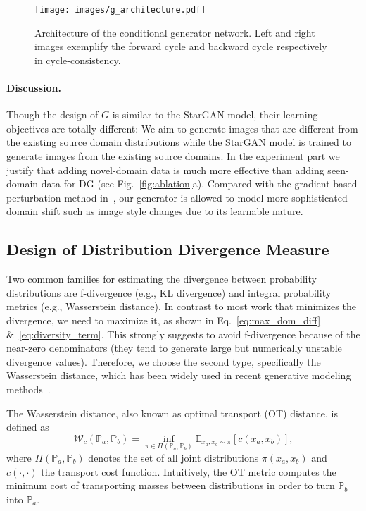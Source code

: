 \documentclass[runningheads]{llncs}
\begin{document}
\begin{figure}[t]
    \centering
    \texttt{[image: images/g\_architecture.pdf]}
    \caption{Architecture of the conditional generator network. Left and right images exemplify the forward cycle and backward cycle respectively in cycle-consistency.}
    \label{fig:g_architecture}
\end{figure}

\paragraph{Discussion.}
Though the design of $G$ is similar to the StarGAN model, their learning objectives are totally different: We aim to generate images that are different from the existing source domain distributions while the StarGAN model is trained to generate images from the existing source domains. In the experiment part we justify that adding novel-domain data is much more effective than adding seen-domain data for DG (see Fig.~\ref{fig:ablation}a). Compared with the gradient-based perturbation method in~\cite{shankar2018generalizing}, our generator is allowed to model more sophisticated domain shift such as image style changes due to its learnable nature.

\subsection{Design of Distribution Divergence Measure} \label{subsec:design_d}
Two common families for estimating the divergence between probability distributions are f-divergence (e.g., KL divergence) and integral probability metrics (e.g., Wasserstein distance). In contrast to most work that minimizes the divergence, we need to maximize it, as shown in Eq.~\eqref{eq:max_dom_diff} \&~\eqref{eq:diversity_term}. This strongly suggests to avoid f-divergence because of the near-zero denominators (they tend to generate large but numerically unstable divergence values). Therefore, we choose the second type, specifically the Wasserstein distance, which has been widely used in recent generative modeling methods~\cite{WGAN,SinkhornAutoDiff,CramerDistance,salimans2018improving,SinGAN}.

The Wasserstein distance, also known as optimal transport (OT) distance, is defined as
\begin{equation} \label{eq:wasserstein}
\mathcal{W}_c (\mathbb{P}_a, \mathbb{P}_b) = \inf_{\pi \in \Pi(\mathbb{P}_a, \mathbb{P}_b)} \mathbb{E}_{x_a, x_b \sim \pi} [c(x_a, x_b)],
\end{equation}
where $\Pi(\mathbb{P}_a, \mathbb{P}_b)$ denotes the set of all joint distributions $\pi(x_a, x_b)$ and $c(\cdot, \cdot)$ the transport cost function. Intuitively, the OT metric computes the minimum cost of transporting masses between distributions in order to turn $\mathbb{P}_b$ into $\mathbb{P}_a$.
\end{document}
